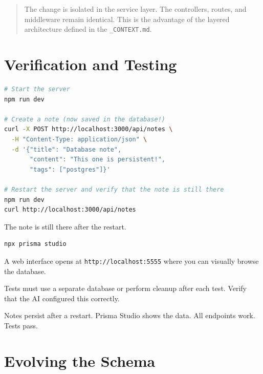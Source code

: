 \begin{quote}
The change is isolated in the service layer. The controllers, routes, and middleware remain identical. This is the advantage of the layered architecture defined in the \texttt{\_CONTEXT.md}.
\end{quote}

\section{Verification and Testing}

\begin{praticabox}[title={Hands-On --- Database testing}]
\begin{lstlisting}[language=bash]
# Start the server
npm run dev

# Create a note (now saved in the database!)
curl -X POST http://localhost:3000/api/notes \
  -H "Content-Type: application/json" \
  -d '{"title": "Database note",
       "content": "This one is persistent!",
       "tags": ["postgres"]}'

# Restart the server and verify that the note is still there
npm run dev
curl http://localhost:3000/api/notes
\end{lstlisting}
The note is still there after the restart.
\end{praticabox}

\begin{praticabox}[title={Hands-On --- Prisma Studio}]
\begin{lstlisting}[language=bash]
npx prisma studio
\end{lstlisting}
A web interface opens at \texttt{http://localhost:5555} where you can visually browse the database.
\end{praticabox}

\begin{warnbox}
Tests must use a separate database or perform cleanup after each test. Verify that the AI configured this correctly.
\end{warnbox}

\begin{checkpointbox}
Notes persist after a restart. Prisma Studio shows the data. All endpoints work. Tests pass.
\end{checkpointbox}

\section{Evolving the Schema}

